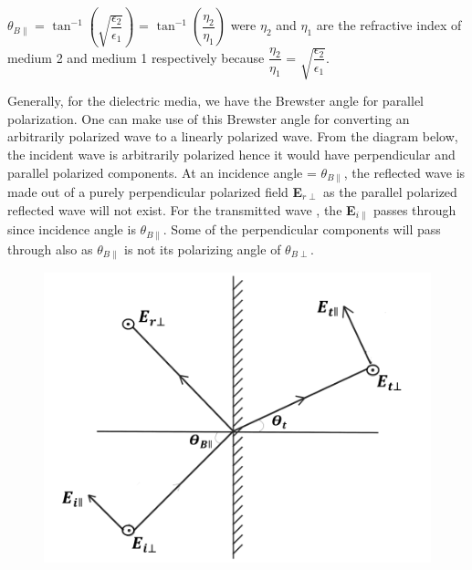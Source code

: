 $\theta_{B\parallel}$ = $\tan^{-1}\left(\sqrt{\dfrac{\epsilon_2}{\epsilon_1}}\right)$ = $\tan^{-1}\left(\dfrac{\eta_2}{\eta_1}\right)$ were $\eta_2$ and $\eta_1$ are the refractive index of medium 2 and medium 1 respectively because $\dfrac{\eta_2}{\eta_1}$ = $\sqrt{\dfrac{\epsilon_2}{\epsilon_1}}$.

Generally, for the dielectric media, we have the Brewster angle for parallel polarization. One can make use of this Brewster angle for converting an arbitrarily polarized wave to a linearly polarized wave. From the diagram below, the incident wave is arbitrarily polarized hence it would have perpendicular and parallel polarized components. At an incidence angle = $\theta_{B\parallel}$, the reflected wave is made out of a purely perpendicular polarized field \textbf{E}$_{r\perp}$ as the parallel polarized reflected wave will not exist. For the transmitted wave , the \textbf{E}$_{i\parallel}$ passes through since incidence angle is $\theta_{B\parallel}$. Some of the perpendicular components will pass through also as $\theta_{B\parallel}$ is not its polarizing angle of $\theta_{B\perp}$.

\begin{figure}[h]
\centering
\includegraphics[width=1\linewidth]{graphics/No_parallel_reflected_wave}
\caption{}
\label{}
\end{figure}

